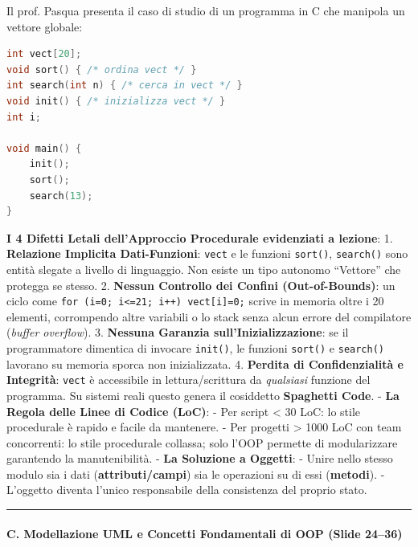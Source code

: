 \documentclass[11pt,a4paper]{article}
\newcommand{\passthrough}[1]{#1}
\begin{document}
Il prof. Pasqua presenta il caso di studio di un programma in C che
manipola un vettore globale:

\begin{lstlisting}[language=C]
int vect[20];
void sort() { /* ordina vect */ }
int search(int n) { /* cerca in vect */ }
void init() { /* inizializza vect */ }
int i;

void main() {
    init();
    sort();
    search(13);
}
\end{lstlisting}

\textbf{I 4 Difetti Letali dell'Approccio Procedurale evidenziati a
lezione}: 1. \textbf{Relazione Implicita Dati-Funzioni}:
\passthrough{\lstinline!vect!} e le funzioni
\passthrough{\lstinline!sort()!}, \passthrough{\lstinline!search()!}
sono entità slegate a livello di linguaggio. Non esiste un tipo autonomo
``Vettore'' che protegga se stesso. 2. \textbf{Nessun Controllo dei
Confini (Out-of-Bounds)}: un ciclo come
\passthrough{\lstinline!for (i=0; i<=21; i++) vect[i]=0;!} scrive in
memoria oltre i 20 elementi, corrompendo altre variabili o lo stack
senza alcun errore del compilatore (\emph{buffer overflow}). 3.
\textbf{Nessuna Garanzia sull'Inizializzazione}: se il programmatore
dimentica di invocare \passthrough{\lstinline!init()!}, le funzioni
\passthrough{\lstinline!sort()!} e \passthrough{\lstinline!search()!}
lavorano su memoria sporca non inizializzata. 4. \textbf{Perdita di
Confidenzialità e Integrità}: \passthrough{\lstinline!vect!} è
accessibile in lettura/scrittura da \emph{qualsiasi} funzione del
programma. Su sistemi reali questo genera il cosiddetto
\textbf{Spaghetti Code}. - \textbf{La Regola delle Linee di Codice
(LoC)}: - Per script \textless{} 30 LoC: lo stile procedurale è rapido e
facile da mantenere. - Per progetti \textgreater{} 1000 LoC con team
concorrenti: lo stile procedurale collassa; solo l'OOP permette di
modularizzare garantendo la manutenibilità. - \textbf{La Soluzione a
Oggetti}: - Unire nello stesso modulo sia i dati
(\textbf{attributi/campi}) sia le operazioni su di essi
(\textbf{metodi}). - L'oggetto diventa l'unico responsabile della
consistenza del proprio stato.

\begin{center}\rule{0.5\linewidth}{0.5pt}\end{center}

\paragraph{C. Modellazione UML e Concetti Fondamentali di OOP (Slide
24--36)}\label{c.-modellazione-uml-e-concetti-fondamentali-di-oop-slide-2436}
\end{document}
